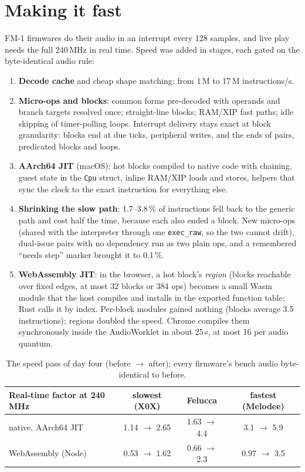 \documentclass[10pt,a4paper]{article}
\newcommand{\code}[1]{\texttt{#1}}
\begin{document}
\section{Making it fast}

FM-1 firmwares do their audio in an interrupt every 128 samples, and live play needs the full
240\,MHz in real time. Speed was added in stages, each gated on the byte-identical audio rule:

\begin{enumerate}
\item \textbf{Decode cache} and cheap shape matching: from 1\,M to 17\,M instructions/s.
\item \textbf{Micro-ops and blocks}: common forms pre-decoded with operands and branch targets
  resolved once; straight-line blocks; RAM/XIP fast paths; idle skipping of timer-polling loops.
  Interrupt delivery stays exact at block granularity: blocks end at due ticks, peripheral writes,
  and the ends of pairs, predicated blocks and loops.
\item \textbf{AArch64 JIT} (macOS): hot blocks compiled to native code with chaining, guest state
  in the \code{Cpu} struct, inline RAM/XIP loads and stores, helpers that sync the clock to the exact
  instruction for everything else.
\item \textbf{Shrinking the slow path}: 1.7--3.8\,\% of instructions fell back to the generic path
  and cost half the time, because each also ended a block. New micro-ops (shared with the
  interpreter through one \code{exec\_raw}, so the two cannot drift), dual-issue pairs with no
  dependency run as two plain ops, and a remembered ``needs step'' marker brought it to 0.1\,\%.
\item \textbf{WebAssembly JIT}: in the browser, a hot block's \emph{region} (blocks reachable over
  fixed edges, at most 32 blocks or 384 ops) becomes a small Wasm module that the host compiles and
  installs in the exported function table; Rust calls it by index. Per-block modules gained nothing
  (blocks average 3.5 instructions); regions doubled the speed. Chrome compiles them synchronously
  inside the AudioWorklet in about 25\,\textmu s, at most 16 per audio quantum.
\end{enumerate}

\begin{table}[h]
\centering\footnotesize
\begin{tabular}{@{}lccc@{}}
\toprule
Real-time factor at 240\,MHz & slowest (X0X) & Felucca & fastest (Melodee)\\
\midrule
native, AArch64 JIT & 1.14 $\rightarrow$ 2.65 & 1.63 $\rightarrow$ 4.4 & 3.1 $\rightarrow$ 5.9\\
WebAssembly (Node) & 0.53 $\rightarrow$ 1.62 & 0.66 $\rightarrow$ 2.3 & 0.97 $\rightarrow$ 3.5\\
\bottomrule
\end{tabular}
\caption{The speed pass of day four (before $\rightarrow$ after); every firmware's bench audio
byte-identical to before.}
\label{tab:speed}
\end{table}
\end{document}
